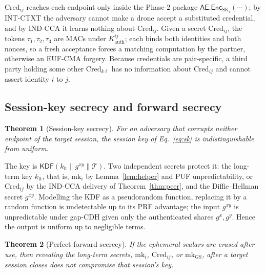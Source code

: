 \documentclass[journal]{IEEEtran}
\newtheorem{theorem}{Theorem}
\begin{document}
\begin{IEEEproof}
$\text{Cred}_{ij}$ reaches each endpoint only inside the Phase-2 package
$\mathsf{AE}.\mathsf{Enc}_{\text{SK}_i}(\cdots)$; by INT-CTXT the adversary
cannot make a drone accept a substituted credential, and by IND-CCA it learns
nothing about $\text{Cred}_{ij}$. Given a secret $\text{Cred}_{ij}$, the tokens
$\tau_1,\tau_2,\tau_3$ are MACs under $K^{ij}_{\text{auth}}$; each binds both
identities and both nonces, so a fresh acceptance forces a matching computation
by the partner, otherwise an EUF-CMA forgery. Because credentials are
pair-specific, a third party holding some other $\text{Cred}_{k\ell}$ has no
information about $\text{Cred}_{ij}$ and cannot assert identity $i$ to $j$.
\end{IEEEproof}

\subsection{Session-key secrecy and forward secrecy}

\begin{theorem}[Session-key secrecy]
\label{thm:key}
For an adversary that corrupts neither endpoint of the target session, the
session key of Eq.~\eqref{eq:sk} is indistinguishable from uniform.
\end{theorem}

\begin{IEEEproof}
The key is $\mathsf{KDF}(k_{\text{lt}} \| g^{xy} \| \mathcal{T})$. Two
independent secrets protect it: the long-term key $k_{\text{lt}}$, that is,
$\text{mk}_i$ by Lemma~\ref{lem:helper} and PUF unpredictability, or
$\text{Cred}_{ij}$ by the IND-CCA delivery of Theorem~\ref{thm:peer}, and the
Diffie--Hellman secret $g^{xy}$. Modelling the KDF as a pseudorandom function,
replacing it by a random function is undetectable up to its PRF advantage; the
input $g^{xy}$ is unpredictable under gap-CDH given only the authenticated
shares $g^{x}, g^{y}$. Hence the output is uniform up to negligible terms.
\end{IEEEproof}

\begin{theorem}[Perfect forward secrecy]
\label{thm:pfs}
If the ephemeral scalars are erased after use, then revealing the long-term
secrets, $\text{mk}_i$, $\text{Cred}_{ij}$, or $\text{mk}_{\text{GS}}$,
\emph{after} a target session closes does not compromise that session's key.
\end{theorem}
\end{document}
